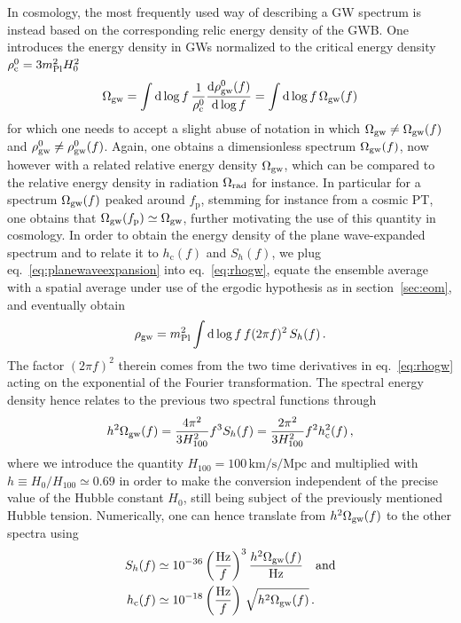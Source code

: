 In cosmology, the most frequently used way of describing a \ac{GW} spectrum is instead based on the corresponding relic energy  density of the \ac{GWB}. One introduces the energy density in \acp{GW} normalized to the critical energy density $\rho_\text{c}^0 = 3 m_\text{Pl}^2 H_0^2$
\begin{align}
	\Omega_{\text{gw}} = \int \mathop{}\!\mathrm{d} \log f\, \frac{1}{\rho_\text{c}^0} \frac{\mathrm d \rho_{\text{gw}}^0(f)}{\mathrm d \log f} = \int \mathop{}\!\mathrm{d} \log f \, \Omega_{\text{gw}}(f) 
	\label{eqOmegaGW}
\end{align}
for which one needs to accept a slight abuse of notation in which $\Omega_{\text{gw}} \neq \Omega_{\text{gw}}(f)$ and $\rho_{\text{gw}}^0 \neq \rho_{\text{gw}}^0(f)$. Again, one obtains a dimensionless spectrum $\Omega_{\text{gw}}(f)$, now however with a related relative energy density $\Omega_{\text{gw}}$, which can be compared to the relative energy density in radiation $\Omega_{\text{rad}}$ for instance. In particular for a spectrum $\Omega_{\text{gw}}(f)$ peaked around $f_\text{p}$, stemming for instance from a cosmic \ac{PT}, one obtains that $\Omega_{\text{gw}}(f_\text{p}) \simeq \Omega_{\text{gw}}$, further motivating the use of this quantity in cosmology. In order to obtain the energy density of the plane wave-expanded spectrum and to relate it to $h_\text{c}(f)$ and $S_h(f)$, we plug eq.~\eqref{eq:planewaveexpansion} into eq.~\eqref{eq:rhogw}, equate the ensemble average with a spatial average under use of the ergodic hypothesis as in section~\ref{sec:eom}, and eventually obtain
\begin{align}
	\rho_{\text{gw}}= m_\text{Pl}^2  \int \mathop{}\!\mathrm{d} \log f \, f  (2 \pi f)^2 \, S_h(f) \, .
\end{align}
The factor $(2 \pi f)^2$ therein comes from the two time  derivatives in eq.~\eqref{eq:rhogw} acting on the exponential of the Fourier transformation. The spectral energy density hence relates to the previous two spectral functions through
\begin{align}
	h^2 \Omega_{\text{gw}}(f) = \frac{4 \pi^2}{3 H_{100}^2}  f^3 S_h(f) = \frac{2 \pi^2}{3 H_{100}^2}  f^2 h_\text{c}^2(f) \, ,  \label{eq:specconversion}
\end{align}
where we introduce the quantity $H_{100} = 100 \, \text{km} / \text{s} / \text{Mpc}$ and multiplied with $h \equiv H_0 / H_{100} \simeq 0.69$ in order to make the conversion independent of the precise value of the Hubble constant $H_0$, still being subject of the previously mentioned Hubble tension. Numerically, one can hence translate from $h^2 \Omega_{\text{gw}}(f)$ to the other spectra using
\begin{align}
	S_h(f) &\simeq 10^{-36} \left(\frac{\text{Hz}}{f}\right)^3 \frac{h^2\Omega_{\text{gw}}(f)}{\text{Hz}}\quad \text{and} \\
	h_\text{c}(f) &\simeq 10^{-18} \left(\frac{\text{Hz}}{f}\right) \, \sqrt{h^2 \Omega_{\text{gw}}(f)} \, .
\end{align}





